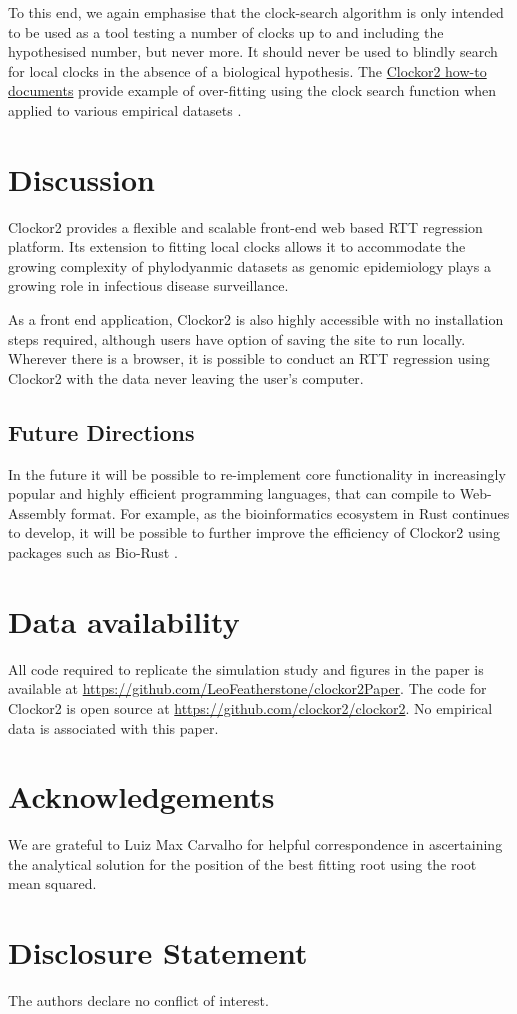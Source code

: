 \documentclass{article}
\begin{document}
To this end, we again emphasise that the clock-search algorithm is only intended to be used as a tool testing a number of clocks up to and including the hypothesised number, but never more. It should never be used to blindly search for local clocks in the absence of a biological hypothesis. The \href{https://clockor2.github.io/clockor2/}{Clockor2 how-to documents} provide example of over-fitting using the clock search function when applied to various empirical datasets \citep{porter2023evolutionary,dudas_mers-cov_2018}.

\section*{Discussion}
Clockor2 provides a flexible and scalable front-end web based RTT regression platform. Its extension to fitting local clocks allows it to accommodate the growing complexity of phylodyanmic datasets as genomic epidemiology plays a growing role in infectious disease surveillance. 

As a front end application, Clockor2 is also highly accessible with no installation steps required, although users have option of saving the site to run locally. Wherever there is a browser, it is possible to conduct an RTT regression using Clockor2 with the data never leaving the user's computer.

\subsection*{Future Directions}
In the future it will be possible to re-implement core functionality in increasingly popular and highly efficient programming languages, that can compile to Web-Assembly format. For example, as the bioinformatics ecosystem in Rust continues to develop, it will be possible to further improve the efficiency of Clockor2 using packages such as Bio-Rust \citep{koester_rust-bio-2015}.


\section*{Data availability}
All code required to replicate the simulation study and figures in the paper is available at \url{https://github.com/LeoFeatherstone/clockor2Paper}. The code for Clockor2 is open source at \url{https://github.com/clockor2/clockor2}. No empirical data is associated with this paper.

\section*{Acknowledgements}
We are grateful to Luiz Max Carvalho for helpful correspondence in ascertaining the analytical solution for the position of the best fitting root using the root mean squared.

\section*{Disclosure Statement}
The authors declare no conflict of interest.


\end{document}
